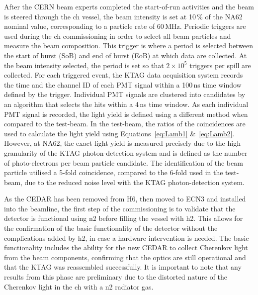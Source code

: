 \documentclass[../../main.tex]{subfiles}
\begin{document}
    After the CERN beam experts completed the start-of-run activities and the beam is steered through the \gls{ch} vessel, the beam intensity is set at 10\,\% of the NA62 nominal value, corresponding to a particle rate 
    of 60\,MHz. Periodic triggers are used during the \gls{ch} commissioning in order to select all beam particles and measure the beam composition. This trigger is where a period is selected between the start of burst (SoB) and end of burst (EoB) at which data are collected. At the beam intensity selected, the period is set so that $2 \times 10^{5}$ triggers per spill are collected. 
    For each triggered event, the KTAG data acquisition system records the time and the channel ID of each \gls{PMT} signal within a 100\,ns time window defined by the trigger. Individual \gls{PMT} signals are clustered into candidates by an algorithm that selects the hits within a 4\,ns time window. 
    As each individual \gls{PMT} signal is recorded, the light yield is defined using a different method when compared to the test-beam. In the test-beam, the ratios of the coincidences are used to calculate the light yield using Equations~\ref{eq:Lamb1} \&~\ref{eq:Lamb2}. However, at NA62, the exact light yield is measured precisely due to the high granularity of the KTAG photon-detection system and is defined as the number of photo-electrons per beam particle candidate.
    The identification of the beam particle utilised a 5-fold coincidence, compared to the 6-fold used in the test-beam, due to the reduced noise level with the KTAG photon-detection system.

    As the \gls{CEDAR} has been removed from H6, then moved to ECN3 and installed into the beamline, the first step of the commissioning is to validate that the detector is functional using \gls{n2} before filling the vessel with \gls{h2}. 
    This allows for the confirmation of the basic functionality of the detector without the complications added by \gls{h2}, in case a hardware intervention is needed. The basic functionality includes the ability for the new \gls{CEDAR} to collect Cherenkov light from the beam components, confirming that the optics are still operational and that the KTAG was reassembled successfully.
    It is important to note that any results from this phase are preliminary due to the distorted nature of the Cherenkov light in the \gls{ch} with a \gls{n2} radiator gas. 
    
\end{document}
